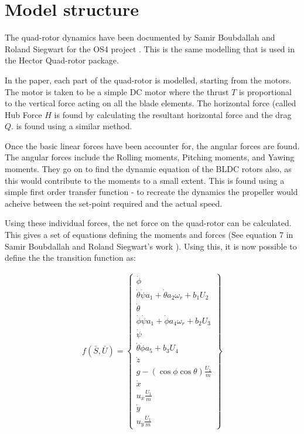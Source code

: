 \documentclass[hidelinks,BTech]{iitmdiss}
\begin{document}
\section{Model structure}

The quad-rotor dynamics have been documented by Samir Boubdallah and Roland Siegwart for the OS4 project \cite{QuadrotorDynamics}. This is the same modelling that is used in the Hector Quad-rotor package.

In the paper, each part of the quad-rotor is modelled, starting from the motors. The motor is taken to be a simple DC motor where the thrust $T$ is proportional to the vertical force acting on all the blade elements. The horizontal force (called Hub Force $H$ is found by calculating the resultant horizontal force and the drag $Q$. is found using a similar method.

Once the basic linear forces have been accounter for, the angular forces are found. The angular forces include the Rolling moments, Pitching moments, and Yawing moments. They go on to find the dynamic equation of the BLDC rotors also, as this would contribute to the moments to a small extent. This is found using a simple first order transfer function - to recreate the dynamics the propeller would acheive between the set-point required and the actual speed.

Using these individual forces, the net force on the quad-rotor can be calculated. This gives a set of equations defining the moments and forces (See equation 7 in Samir Boubdallah and Roland Siegwart's work \cite{QuadrotorDynamics}). Using this, it is now possible to define the the transition function as:

\begin{equation} \begin{split}
  f(\bar{S}, \bar{U}) = \left\{
    \begin{array}{c}
      \dot{\phi} \\
      \dot{\theta} \dot{\psi} a_{1} + \dot{\theta} a_{2} \omega_{r} + b_{1} U_{2} \\
      \dot{\theta} \\
      \dot{\phi} \dot{\psi} a_{1} + \dot{\phi} a_{4} \omega_{r} + b_{2} U_{3} \\
      \dot{\psi} \\
      \dot{\theta} \dot{\phi} a_{5} + b_{3} U_{4} \\
      \dot{z} \\
      g  - (\cos{\phi} \cos{\theta})\frac{U_{1}}{m} \\
      \dot{x} \\
      u_{x} \frac{U_{1}}{m} \\
      \dot{y} \\
      u_{y} \frac{U_{1}}{m}
    \end{array}
  \right\}
\end{split} \end{equation}
\end{document}
